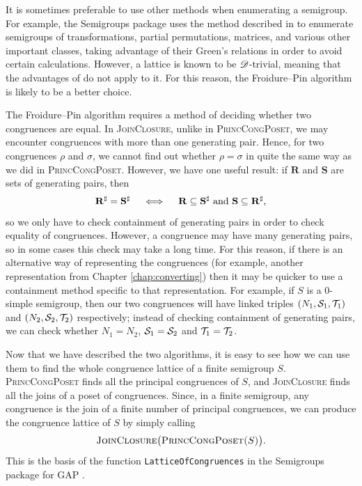 It is sometimes preferable to use other methods when enumerating a semigroup.
For example, the Semigroups package uses the method described in
\cite{computing_finite_semigroups} to enumerate semigroups of transformations,
partial permutations, matrices, and various other important classes, taking
advantage of their Green's relations in order to avoid certain calculations.
However, a lattice is known to be $\mathscr{D}$-trivial, meaning that the advantages of
\cite{computing_finite_semigroups} do not apply to it.  For this reason, the
Froidure--Pin algorithm is likely to be a better choice.

The Froidure--Pin algorithm requires a method of deciding whether two
congruences are equal.  In \textsc{JoinClosure}, unlike in
\textsc{PrincCongPoset}, we may encounter congruences with more than one
generating pair.  Hence, for two congruences $\rho$ and $\sigma$, we cannot find
out whether $\rho = \sigma$ in quite the same way as we did in
\textsc{PrincCongPoset}.  However, we have one useful result: if $\mathbf{R}$
and $\mathbf{S}$ are sets of generating pairs, then
$$\mathbf{R}^\sharp = \mathbf{S}^\sharp \quad\iff\quad
\mathbf{R} \subseteq \mathbf{S}^\sharp \textnormal{~and~}
\mathbf{S} \subseteq \mathbf{R}^\sharp,$$
so we only have to check containment of generating pairs in order to check
equality of congruences.  However, a congruence may have many generating pairs,
so in some cases this check may take a long time.  For this reason, if there is
an alternative way of representing the congruences (for example, another
representation from Chapter \ref{chap:converting}) then it may be quicker to use
a containment method specific to that representation.  For example, if $S$ is a
0-simple semigroup, then our two congruences will have linked triples
$(N_1,\mathcal{S}_1,\mathcal{T}_1)$ and $(N_2,\mathcal{S}_2,\mathcal{T}_2)$ respectively; instead of checking
containment of generating pairs, we can check whether $N_1 = N_2$,
$\mathcal{S}_1 = \mathcal{S}_2$ and $\mathcal{T}_1 = \mathcal{T}_2$.

Now that we have described the two algorithms, it is easy to see how we can use
them to find the whole congruence lattice of a finite semigroup $S$.
\textsc{PrincCongPoset} finds all the principal congruences of $S$, and
\textsc{JoinClosure} finds all the joins of a poset of congruences.  Since, in a
finite semigroup, any congruence is the join of a finite number of principal
congruences, we can produce the congruence lattice of $S$ by simply calling
$$\textsc{JoinClosure\big(PrincCongPoset($S$)\big)}.$$  This is the basis of the
function \texttt{LatticeOfCongruences} in the Semigroups package for GAP
\cite{semigroups}.

